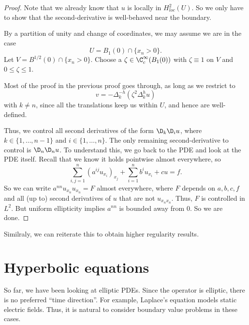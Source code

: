 \documentclass[a4paper]{article}
\begin{document}
\begin{proof}
  Note that we already know that $u$ is locally in $H^2_{loc}(U)$. So we only have to show that the second-derivative is well-behaved near the boundary.

  By a partition of unity and change of coordinates, we may assume we are in the case
  \[
    U = B_1(0) \cap \{x_n > 0\}.
  \]
  Let $V = B^{1/2}(0) \cap \{x_n > 0\}$. Choose a $\zeta \in \C_c^\infty(B_1(0))$ with $\zeta \equiv 1$ on $V$ and $0 \leq \zeta \leq 1$.

  Most of the proof in the previous proof goes through, as long as we restrict to
  \[
    v = - \Delta_k^{-h} (\zeta^2 \Delta^h_k u)
  \]
  with $k \not= n$, since all the translations keep us within $U$, and hence are well-defined.
%

  Thus, we control all second derivatives of the form $\D_k \D_i u$, where $k \in \{1, \ldots, n - 1\}$ and $i \in \{1, \ldots, n\}$. The only remaining second-derivative to control is $\D_n \D_n u$. To understand this, we go back to the PDE and look at the PDE itself. Recall that we know it holds pointwise almost everywhere, so
  \[
    \sum_{i, j = 1}^n (a^{ij} u_{x_i})_{x_j} + \sum_{i = 1}^n b^i u_{x_i} + cu = f.
  \]
  So we can write $a^{nn} u_{x_n} u_{x_n} = F$ almost everywhere, where $F$ depends on $a, b, c, f$ and all (up to) second derivatives of $u$ that are not $u_{x_n x_n}$. Thus, $F$ is controlled in $L^2$. But uniform ellipticity implies $a^{nn}$ is bounded away from $0$. So we are done.
\end{proof}
Similraly, we can reiterate this to obtain higher regularity results.

\section{Hyperbolic equations}
So far, we have been looking at elliptic PDEs. Since the operator is elliptic, there is no preferred ``time direction''. For example, Laplace's equation models static electric fields. Thus, it is natural to consider boundary value problems in these cases.
\end{document}

